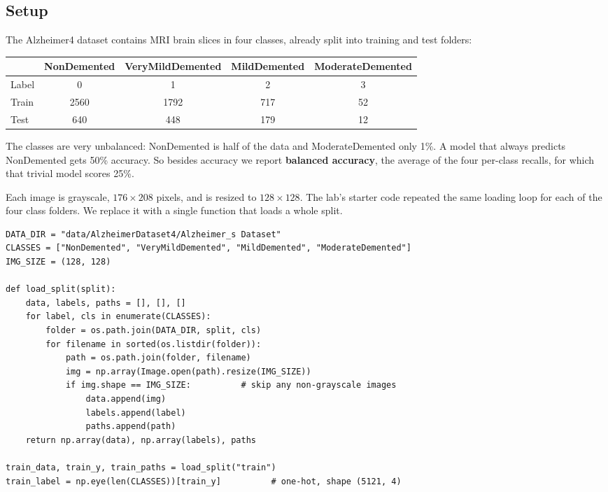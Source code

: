 \documentclass[11pt]{article}
\begin{document}
\subsection*{Setup}

The Alzheimer4 dataset contains MRI brain slices in four classes, already split into
training and test folders:

\begin{center}
\begin{tabular}{lcccc}
\toprule
 & NonDemented & VeryMildDemented & MildDemented & ModerateDemented \\
\midrule
Label & 0 & 1 & 2 & 3 \\
Train & 2560 & 1792 & 717 & 52 \\
Test  & 640  & 448  & 179 & 12 \\
\bottomrule
\end{tabular}
\end{center}

The classes are very unbalanced: NonDemented is half of the data and ModerateDemented
only 1\%. A model that always predicts NonDemented gets 50\% accuracy. So besides accuracy we
report \textbf{balanced accuracy}, the average of the four per-class recalls, for which
that trivial model scores 25\%.

Each image is grayscale, $176 \times 208$ pixels, and is resized to $128 \times 128$. The
lab's starter code repeated the same loading loop for each of the four class folders. We
replace it with a single function that loads a whole split.

\begin{lstlisting}
DATA_DIR = "data/AlzheimerDataset4/Alzheimer_s Dataset"
CLASSES = ["NonDemented", "VeryMildDemented", "MildDemented", "ModerateDemented"]
IMG_SIZE = (128, 128)

def load_split(split):
    data, labels, paths = [], [], []
    for label, cls in enumerate(CLASSES):
        folder = os.path.join(DATA_DIR, split, cls)
        for filename in sorted(os.listdir(folder)):
            path = os.path.join(folder, filename)
            img = np.array(Image.open(path).resize(IMG_SIZE))
            if img.shape == IMG_SIZE:          # skip any non-grayscale images
                data.append(img)
                labels.append(label)
                paths.append(path)
    return np.array(data), np.array(labels), paths

train_data, train_y, train_paths = load_split("train")
train_label = np.eye(len(CLASSES))[train_y]          # one-hot, shape (5121, 4)
\end{lstlisting}
\end{document}
